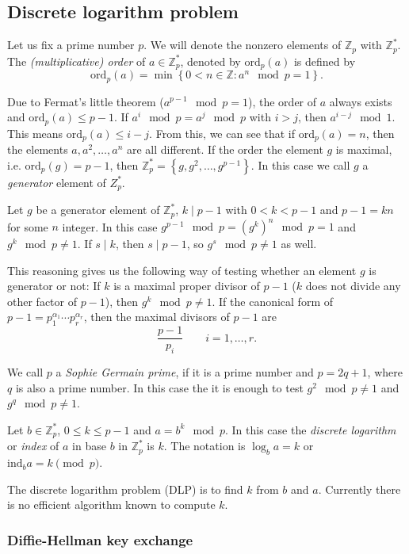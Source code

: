 \documentclass{article}
\newcommand{\Z}{\mathbb{Z}}
\begin{document}
\subsection{Discrete logarithm problem}

Let us fix a prime number $p$. We will denote the nonzero elements of $\Z_p$ with $\Z_p^*$.
The \emph{(multiplicative) order} of $a \in \Z_p^*$, denoted by $\mathrm{ord}_p(a)$ is defined by
\[
    \mathrm{ord}_p(a) = \min\left\{ 0 < n \in \Z : a^{n} \mod p = 1 \right\}.
\]

Due to Fermat's little theorem ($a^{p-1} \mod p = 1$), the order of $a$ always exists and $\mathrm{ord}_p(a) \le p-1$.
If $a^i \mod p = a^j \mod p$ with $i > j$, then $a^{i-j} \mod 1$. This means $\mathrm{ord}_p(a) \le i-j$.
From this, we can see that if $\mathrm{ord}_p(a) = n$, then the elements $a, a^2, \ldots, a^n$ are all different.
If the order the element $g$ is maximal, i.e. $\mathrm{ord}_p(g) = p - 1$, then $\Z_p^* = \left\{ g, g^2, \ldots, g^{p-1} \right\}$.
In this case we call $g$ a \emph{generator} element of $Z_p^*$.

Let $g$ be a generator element of $\Z_p^*$, $k \mid p-1$ with $0 < k < p-1$ and $p-1 = kn$ for some $n$ integer.
In this case $g^{p-1} \mod p = (g^k)^n \mod p = 1$ and $g^k \mod p \neq 1$.
If $s \mid k$, then $s \mid p-1$, so $g^s \mod p \neq 1$ as well.

This reasoning gives us the following way of testing whether an element $g$ is generator or not:
If $k$ is a maximal proper divisor of $p-1$ ($k$ does not divide any other factor of $p-1$), then $g^k \mod p \neq 1$.
If the canonical form of $p-1 = p_1^{\alpha_1}\cdots p_r^{\alpha_r}$, then the maximal divisors of $p-1$ are
\[
    \frac{p-1}{p_i} \qquad i=1,\ldots,r.
\]

We call $p$ a \emph{Sophie Germain prime}, if it is a prime number and $p=2q+1$, where $q$ is also a prime number.
In this case the it is enough to test $g^2 \mod p \neq 1$ and $g^{q} \mod p \neq 1$.

Let $b \in \Z_p^*$, $0 \le k \le p-1$ and $a = b^k \mod p$.
In this case the \emph{discrete logarithm} or \emph{index} of $a$ in base $b$ in $\Z_p^*$ is $k$.
The notation is $\log_b a = k$ or $\mathrm{ind}_b a = k \pmod{p}$.

The discrete logarithm problem (DLP) is to find $k$ from $b$ and $a$.
Currently there is no efficient algorithm known to compute $k$.

\subsubsection{Diffie-Hellman key exchange}
\end{document}
